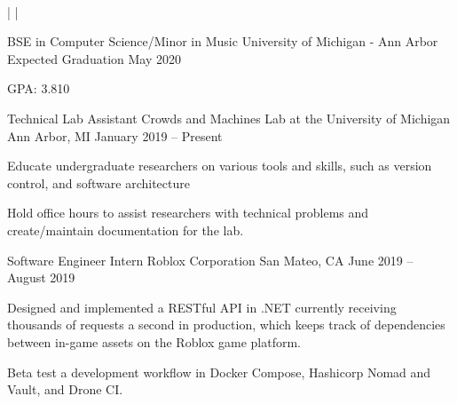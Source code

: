 \documentclass[]{awesome-cv}
\begin{document}
    
\begin{center}
	  \\

	{} | {} | {}
\end{center}
\vspace{-4mm}
\vspace{-2mm}
\cventry
	{BSE in Computer Science/Minor in Music}
	{University of Michigan - Ann Arbor}
	{}
	{Expected Graduation May 2020}
	{\begin{cvitems}
		\item{GPA: 3.810}
		\end{cvitems}}

\vspace{-5mm}
\vspace{-2mm}

	\cventry
	{Technical Lab Assistant}
	{Crowds and Machines Lab at the University of Michigan}
	{Ann Arbor, MI}
	{January 2019 – Present}
	{\begin{cvitems}
		\item {Educate undergraduate researchers on various tools and skills, such as version control, and software architecture}
		\item {Hold office hours to assist researchers with technical problems and create/maintain documentation for the lab.}
	\end{cvitems}}

	\vspace{-4mm}
	\cventry
	{Software Engineer Intern}
	{Roblox Corporation}
	{San Mateo, CA}
	{June 2019 – August 2019}
	{\begin{cvitems}
		\item {Designed and implemented a RESTful API in .NET currently receiving thousands of requests a second in production,
		 which keeps track of dependencies between in-game assets on the Roblox game platform.}
		\item {Beta test a development workflow in Docker Compose, Hashicorp 
		Nomad and Vault, and Drone CI.}
	\end{cvitems}}
\end{document}
